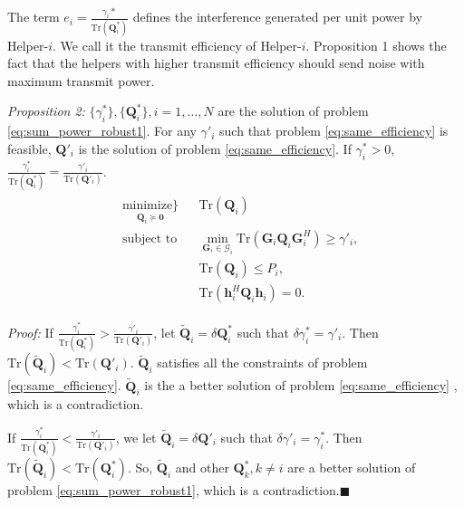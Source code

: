 \documentclass[journal]{IEEEtran}
\begin{document}
The term $e_i = \frac{\gamma_i*}{\mathrm{Tr}(\mathbf{Q}_i^*)}$ defines the interference generated per unit power by Helper-$i$. We call it the transmit efficiency of Helper-$i$. Proposition 1 shows the fact that the helpers with higher transmit efficiency should send noise with maximum transmit power.

\emph{Proposition 2:} $\{\gamma_i^*\}, \{\mathbf{Q}_i^*\}, i = 1, \ldots, N$ are the solution of problem \eqref{eq:sum_power_robust1}. For any $ \gamma'_i$ such that problem \eqref{eq:same_efficiency} is feasible, $ \mathbf{Q}'_i$ is the solution of problem \eqref{eq:same_efficiency}. If $\gamma_i^* > 0$, $\frac{\gamma_i^*}{\text{Tr}(\mathbf{Q}_i^*)} = \frac{\gamma'_i}{\text{Tr}(\mathbf{Q}'_i)}$.
\begin{eqnarray}\label{eq:same_efficiency}
\begin{aligned} 
& \underset{\mathbf{Q}_i \succeq \mathbf{0}}{\text{minimize}\}}
& & \text{Tr}(\mathbf{Q}_i)\\
& \text{subject to}
& & \min_{\mathbf{G}_i \in \mathcal{G}_i}\text{Tr}\left(\mathbf{G}_i\mathbf{Q}_i\mathbf{G}_i^H\right) \geq \gamma'_i,\\
&&& \text{Tr}\left(\mathbf{Q}_i\right) \leq P_i,\\ 
&&&\text{Tr}\left(\mathbf{h}_i^H\mathbf{Q}_i\mathbf{h}_i\right) = 0.
\end{aligned}
\end{eqnarray}

\emph{Proof:} If $\frac{\gamma_i^*}{\text{Tr}(\mathbf{Q}_i^*)} > \frac{\gamma'_i}{\text{Tr}(\mathbf{Q}'_i)}$, let $\tilde{\mathbf{Q}}_i = \delta\mathbf{Q}_i^ *$ such that $\delta\gamma_i^* = \gamma'_i$. Then $\text{Tr}(\tilde{\mathbf{Q}}_i) < \text{Tr}(\mathbf{Q}'_i)$. $\tilde{\mathbf{Q}}_i$ satisfies all the constraints of problem \eqref{eq:same_efficiency}. $\tilde{\mathbf{Q}}_i$  is the a better solution of problem \eqref{eq:same_efficiency} , which is a contradiction.

If $\frac{\gamma_i^*}{\text{Tr}(\mathbf{Q}_i^*)} < \frac{\gamma'_i}{\text{Tr}(\mathbf{Q}'_i)}$, we let $\tilde{\mathbf{Q}}_i = \delta\mathbf{Q}'_i$ such that $\delta\gamma'_i = \gamma_i^*$. Then $\text{Tr}(\tilde{\mathbf{Q}}_i) < \text{Tr}(\mathbf{Q}^*_i)$. So,  $\tilde{\mathbf{Q}}_i$ and other $\mathbf{Q}_k^*, k \neq i$ are a better solution of problem \eqref{eq:sum_power_robust1}, which is a contradiction.$\blacksquare$


\end{document}
